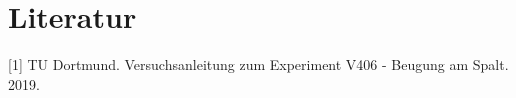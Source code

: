 \section{Literatur}

[1] TU Dortmund. Versuchsanleitung zum Experiment V406 - Beugung am Spalt. 2019.